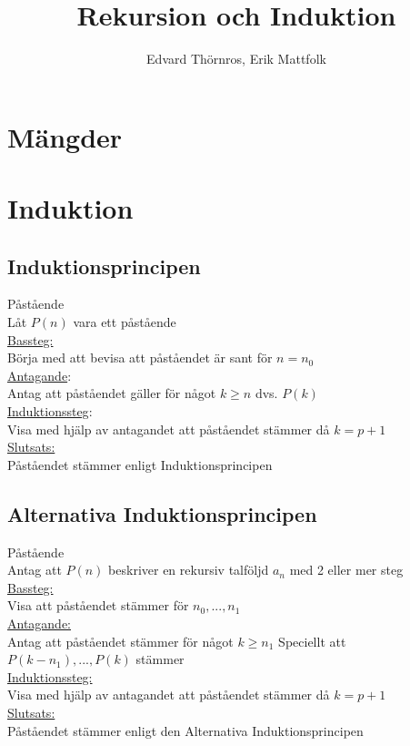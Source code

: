 \documentclass{article}
\title{Rekursion och Induktion}
\author{Edvard Thörnros, Erik Mattfolk}
\begin{document}
	\maketitle
	\newpage

	\section{Mängder}

	\section{Induktion}
	\subsection{Induktionsprincipen}
	Påstående \\ 
	Låt $P(n)$ vara ett påstående \\
	\underline{Bassteg:} \\
	Börja med att bevisa att påståendet är sant för $n = n_{0}$ \\
	\underline{Antagande}: \\
	Antag att påståendet gäller för något $k \geq n$ dvs. $P(k)$ \\
	\underline{Induktionssteg}: \\
	Visa med hjälp av antagandet att påståendet stämmer då $k = p + 1$ \\
	\underline{Slutsats:} \\
	Påståendet stämmer enligt Induktionsprincipen \\
	\subsection{Alternativa Induktionsprincipen}
	Påstående \\
	Antag att $P(n)$ beskriver en rekursiv talföljd $a_{n}$ med 2 eller mer steg \\
	\underline{Bassteg:} \\
	Visa att påståendet stämmer för $n_{0}, ... , n_{1}$ \\
	\underline{Antagande:} \\
	Antag att påståendet stämmer för något $k \geq n_{1}$ Speciellt att $P(k-n_{1}), ... , P(k)$ stämmer \\
	\underline{Induktionssteg:} \\
	Visa med hjälp av antagandet att påståendet stämmer då $k = p + 1$ \\
	\underline{Slutsats:} \\
	Påståendet stämmer enligt den Alternativa Induktionsprincipen \\
\end{document}
